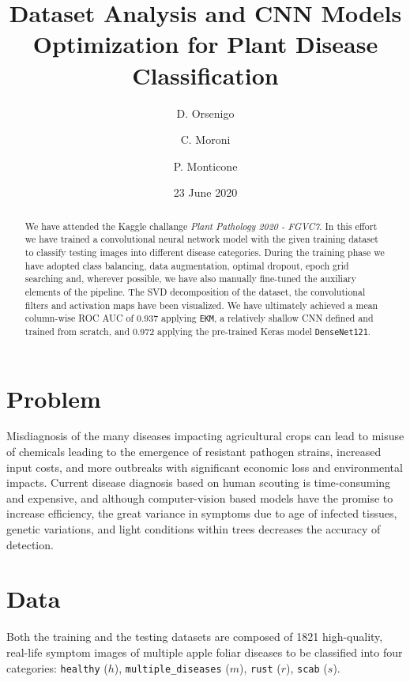 \documentclass[aps,twocolumn,secnumarabic,nobalancelastpage,amsmath,amssymb,
nofootinbib]{revtex4}
\begin{document}
\title{Dataset Analysis and CNN Models Optimization for Plant Disease
	Classification}
\author {D. Orsenigo}
\author {C. Moroni}
\author {P. Monticone}

\date{23 June 2020}
\begin{abstract}
	We have attended the Kaggle challange \emph{Plant Pathology 2020 -
		FGVC7}. In this effort we have trained a convolutional neural network
	model with the given training dataset to classify testing images into
	different disease categories. During the training phase we have adopted
	class balancing, data augmentation, optimal dropout, epoch grid
	searching and, wherever possible, we have also manually fine-tuned the
	auxiliary elements of the pipeline. The SVD decomposition of the
	dataset, the convolutional filters and activation maps have been
	visualized. We have ultimately achieved a mean column-wise ROC AUC of
	0.937 applying \texttt{EKM}, a relatively shallow CNN defined and
	trained from scratch, and 0.972 applying the pre-trained Keras model
	\texttt{DenseNet121}.\\
\end{abstract}
\maketitle
\tableofcontents

\section{Problem}
Misdiagnosis of the many diseases impacting agricultural crops can lead to misuse of chemicals leading to the emergence of resistant pathogen strains, increased input costs, and more outbreaks with significant economic loss and environmental impacts. Current disease diagnosis based on human scouting is time-consuming and expensive, and although computer-vision based models have the promise to increase efficiency, the great variance in symptoms due to age of infected tissues, genetic variations, and light conditions within trees decreases the accuracy of detection.

\section{Data}
Both the training and the testing datasets are composed of 1821
high-quality, real-life symptom images of multiple apple foliar diseases
to be classified into four categories: \texttt{healthy} (\(h\)),
\texttt{multiple\_diseases} (\(m\)), \texttt{rust} (\(r\)),
\texttt{scab} (\(s\)). \newline
\end{document}
